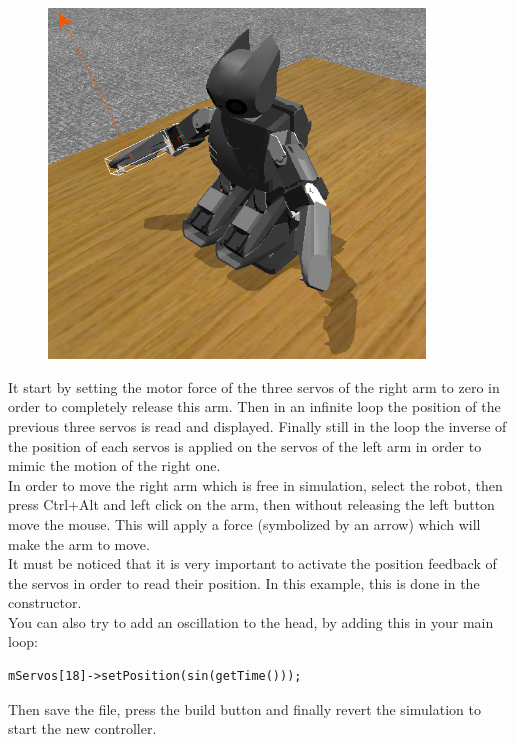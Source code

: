 \documentclass[a4paper, 12pt]{article}  		%
\begin{document}
\begin{figure}[H]
\begin{center}
\includegraphics[width=10cm]{example_symmetry.png}
\label{example_symmetry.png}
\end{center}
\end{figure}

It start by setting the motor force of the three servos of the right arm to zero in order to completely release this arm.
Then in an infinite loop the position of the previous three servos is read and displayed.
Finally still in the loop the inverse of the position of each servos is applied on the servos of the left arm in order to mimic the motion of the right one.\\
 In order to move the right arm which is free in simulation, select the robot, then press Ctrl+Alt and left click on the arm, then without releasing the left button move the mouse. This will apply a force (symbolized by an arrow) which will make the arm to move.\\
It must be noticed that it is very important to activate the position feedback of the servos in order to read their position. In this example, this is done in the constructor.\\

You can also try to add an oscillation to the head, by adding this in your main loop:
\lstset{language=c++} 
\lstset{commentstyle=\textit} 
\begin{lstlisting} 
mServos[18]->setPosition(sin(getTime()));
\end{lstlisting}

Then save the file, press the build button and finally revert the simulation to start the new controller.\\
\end{document}
